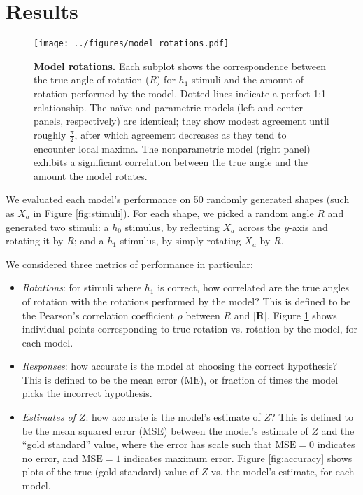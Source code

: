 \documentclass{article} %
\newcommand{\MSE}[0]{\mathrm{MSE}}
\newcommand{\ME}[0]{\mathrm{ME}}
\newcommand{\naive}[0]{na\"ive}
\begin{document}
\section{Results}


\begin{figure}[t]
  \centering
  \texttt{[image: ../figures/model\_rotations.pdf]}
  \caption{\textbf{Model rotations.} Each subplot shows the
    correspondence between the true angle of rotation ($R$) for $h_1$
    stimuli and the amount of rotation performed by the model. Dotted
    lines indicate a perfect 1:1 relationship. The \naive{} and
    parametric models (left and center panels, respectively) are
    identical; they show modest agreement until roughly
    $\frac{\pi}{2}$, after which agreement decreases as they tend to
    encounter local maxima. The nonparametric model (right panel)
    exhibits a significant correlation between the true angle and the
    amount the model rotates.}
  \label{fig:rotations}
\end{figure}

We evaluated each model's performance on 50 randomly generated shapes
(such as $X_a$ in Figure \ref{fig:stimuli}). For each shape, we picked
a random angle $R$ and generated two stimuli: a $h_0$ stimulus, by
reflecting $X_a$ across the $y$-axis and rotating it by $R$; and a
$h_1$ stimulus, by simply rotating $X_a$ by $R$.

We considered three metrics of performance in particular:
\begin{itemize}
\item \textit{Rotations}: for stimuli where $h_1$ is correct, how
  correlated are the true angles of rotation with the rotations
  performed by the model? This is defined to be the Pearson's
  correlation coefficient $\rho$ between $R$ and $\vert
  \mathbf{R}\vert$. Figure \ref{fig:rotations} shows individual points
  corresponding to true rotation vs. rotation by the model, for each
  model.
\item \textit{Responses}: how accurate is the model at choosing the
  correct hypothesis? This is defined to be the mean error ($\ME{}$),
  or fraction of times the model picks the incorrect hypothesis.
\item \textit{Estimates of $Z$}: how accurate is the model's estimate
  of $Z$? This is defined to be the mean squared error ($\MSE{}$)
  between the model's estimate of $Z$ and the ``gold standard'' value,
  where the error has scale such that $\MSE{}=0$ indicates no error,
  and $\MSE{}=1$ indicates maximum error. Figure \ref{fig:accuracy}
  shows plots of the true (gold standard) value of $Z$ vs. the model's
  estimate, for each model.
\end{itemize}
\end{document}
